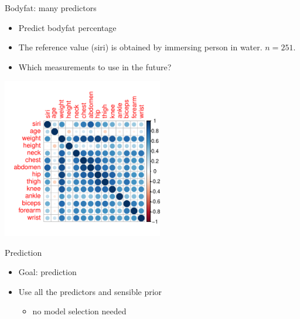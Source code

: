\documentclass[english,t]{beamer}
\begin{document}
  

\begin{frame}{Bodyfat: many predictors}

  \vspace{-0.75\baselineskip}
  \begin{itemize}
  \item Predict bodyfat percentage
  \item The reference value (siri) is obtained by
    immersing person in water. $n=251$.
  \item Which measurements to use in the future?
  \end{itemize}
  \pause
  \vspace{-0.7\baselineskip}
  \includegraphics[width=7cm]{bodyfat_corr.pdf}

\end{frame}

\begin{frame}{Prediction}

  \begin{itemize}
  \item Goal: prediction
  \item<2-> Use all the predictors and sensible prior
    \begin{itemize}
    \item<3-> no model selection needed
    \end{itemize}
  \end{itemize}

\end{frame}
\end{document}
